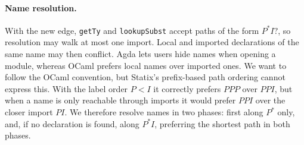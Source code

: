 \paragraph{Name resolution.} With the new edge, \texttt{getTy} and
\texttt{lookupSubst} accept paths of the form $P^* I?$, so resolution may walk
at most one import. Local and imported declarations of the same name may then
conflict. Agda lets users hide names when opening a module, whereas OCaml prefers local
names over imported ones. We want to follow the OCaml convention, but Statix's prefix-based path ordering cannot express this. With the label
order $P < I$ it correctly prefers $PPP$ over $PPI$, but when a name is only
reachable through imports it would prefer $PPI$ over the closer import $PI$. We
therefore resolve names in two phases: first along $P^*$ only, and, if no
declaration is found, along $P^* I$, preferring the shortest path in both
phases.

